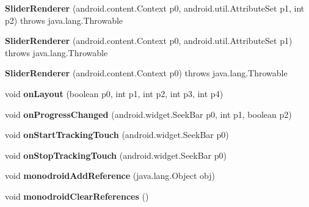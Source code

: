 \begin{DoxyCompactItemize}
\item 
\mbox{\label{classmd5b60ffeb829f638581ab2bb9b1a7f4f3f_1_1_slider_renderer_ac4a155c9357e2f48baece33e8590b462}} 
{\bfseries Slider\+Renderer} (android.\+content.\+Context p0, android.\+util.\+Attribute\+Set p1, int p2)  throws java.\+lang.\+Throwable 	
\item 
\mbox{\label{classmd5b60ffeb829f638581ab2bb9b1a7f4f3f_1_1_slider_renderer_aa6d32149e1dbf9076af62a46ae72331f}} 
{\bfseries Slider\+Renderer} (android.\+content.\+Context p0, android.\+util.\+Attribute\+Set p1)  throws java.\+lang.\+Throwable 	
\item 
\mbox{\label{classmd5b60ffeb829f638581ab2bb9b1a7f4f3f_1_1_slider_renderer_afe6177683ec0ebd537f6aa0d703bf526}} 
{\bfseries Slider\+Renderer} (android.\+content.\+Context p0)  throws java.\+lang.\+Throwable 	
\item 
\mbox{\label{classmd5b60ffeb829f638581ab2bb9b1a7f4f3f_1_1_slider_renderer_afac38e4eaa408c22962aa4a88025b986}} 
void {\bfseries on\+Layout} (boolean p0, int p1, int p2, int p3, int p4)
\item 
\mbox{\label{classmd5b60ffeb829f638581ab2bb9b1a7f4f3f_1_1_slider_renderer_a8749343787854a49aedab1eb23f1b5fd}} 
void {\bfseries on\+Progress\+Changed} (android.\+widget.\+Seek\+Bar p0, int p1, boolean p2)
\item 
\mbox{\label{classmd5b60ffeb829f638581ab2bb9b1a7f4f3f_1_1_slider_renderer_a94e46916cabbb945547dd03b6915531b}} 
void {\bfseries on\+Start\+Tracking\+Touch} (android.\+widget.\+Seek\+Bar p0)
\item 
\mbox{\label{classmd5b60ffeb829f638581ab2bb9b1a7f4f3f_1_1_slider_renderer_a7311d722d790861ea5026d332a612245}} 
void {\bfseries on\+Stop\+Tracking\+Touch} (android.\+widget.\+Seek\+Bar p0)
\item 
\mbox{\label{classmd5b60ffeb829f638581ab2bb9b1a7f4f3f_1_1_slider_renderer_a52c4922dec0b09c2a4d75e7488624539}} 
void {\bfseries monodroid\+Add\+Reference} (java.\+lang.\+Object obj)
\item 
\mbox{\label{classmd5b60ffeb829f638581ab2bb9b1a7f4f3f_1_1_slider_renderer_a9db5ee8d3adfe5077ce514f56e2a5984}} 
void {\bfseries monodroid\+Clear\+References} ()
\end{DoxyCompactItemize}
